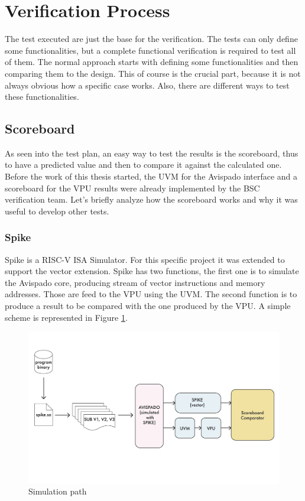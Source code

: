 \section{Verification Process}
The test executed are just the base for the verification. The tests can only define some functionalities, but a complete functional verification is required to test all of them.
The normal approach starts with defining some functionalities and then comparing them to the design. This of course is the crucial part, because it is not always obvious how a specific case works. Also, there are different ways to test these functionalities.

\subsection{Scoreboard}
As seen into the test plan, an easy way to test the results is the scoreboard, thus to have a predicted value and then to compare it against the calculated one.
Before the work of this thesis started, the UVM for the Avispado interface and a scoreboard for the VPU results were already implemented by the BSC verification team. Let's briefly analyze how the scoreboard works and why it was useful to develop other tests.

\subsubsection{Spike}
Spike is a RISC-V ISA Simulator. For this specific project it was extended to support the vector extension.
Spike has two functions, the first one is to simulate the Avispado core, producing stream of vector instructions and memory addresses. Those are feed to the VPU using the UVM. The second function is to produce a result to be compared with the one produced by the VPU. A simple scheme is represented in Figure \ref{bin-to-log}.

\begin{figure}[H]
    \centering
    \includegraphics[scale = 0.6]{Chapter_2/img/bin-to-log.png}
    \caption{Simulation path}
    \label{bin-to-log}
\end{figure}

